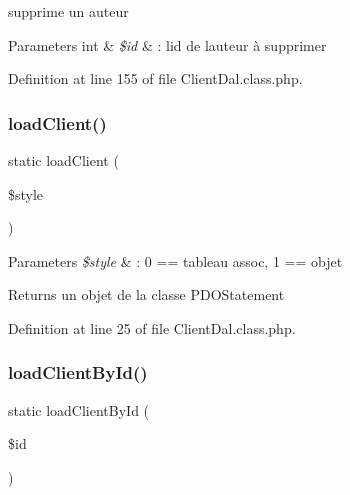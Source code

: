 supprime un auteur 
\begin{DoxyParams}[1]{Parameters}
int & {\em \$id} & \+: l\textquotesingle{}id de l\textquotesingle{}auteur à supprimer \\
\hline
\end{DoxyParams}


Definition at line 155 of file Client\+Dal.\+class.\+php.

\mbox{\label{class_client_dal_a28a664bb9f42ecb82aed0de767fdb4ef}} 
\subsubsection{\texorpdfstring{load\+Client()}{loadClient()}}
{\footnotesize\ttfamily static load\+Client (\begin{DoxyParamCaption}\item[{}]{\$style }\end{DoxyParamCaption})\hspace{0.3cm}{\ttfamily [static]}}


\begin{DoxyParams}{Parameters}
{\em \$style} & \+: 0 == tableau assoc, 1 == objet \\
\hline
\end{DoxyParams}
\begin{DoxyReturn}{Returns}
un objet de la classe P\+D\+O\+Statement 
\end{DoxyReturn}


Definition at line 25 of file Client\+Dal.\+class.\+php.

\mbox{\label{class_client_dal_acc8cc50fdd5f96e4d7f26b60ac06587a}} 
\subsubsection{\texorpdfstring{load\+Client\+By\+Id()}{loadClientById()}}
{\footnotesize\ttfamily static load\+Client\+By\+Id (\begin{DoxyParamCaption}\item[{}]{\$id }\end{DoxyParamCaption})\hspace{0.3cm}{\ttfamily [static]}}

